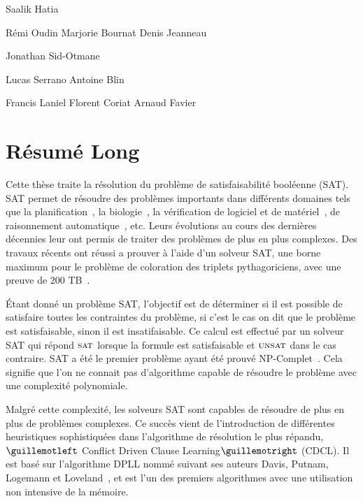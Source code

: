Saalik Hatia

Rémi Oudin
Marjorie Bournat
Denis Jeanneau

Jonathan Sid-Otmane

Lucas Serrano
Antoine Blin

Francis Laniel
Florent Coriat
Arnaud Favier











%
%

\chapter*{Résumé Long}


Cette thèse traite la résolution du problème de satisfaisabilité booléenne (SAT).
SAT permet de résoudre des problèmes importants dans différents domaines tels 
que la planification~\cite{planning_92}, la biologie~\cite{biology_06}, la vérification de logiciel et de 
matériel~\cite{biere1999symbolic}, de raisonnement automatique~\cite{heule2016solving}, etc.
Leurs évolutions au cours des dernières décennies leur ont permis de traiter des problèmes de plus en plus complexes.
Des travaux récents ont réussi a prouver à l'aide d'un solveur SAT, une borne maximum
pour le problème de coloration des triplets pythagoriciens, avec une preuve de 200 TB~\cite{heule2016solving}.


Étant donné un problème SAT, l'objectif est de  déterminer si il est possible de satisfaire toutes les contraintes du
problème, si c'est le cas on dit que le problème est satisfaisable, sinon il est insatifaisable.
%
Ce calcul est effectué par un solveur SAT qui répond $\textsc{sat}$ lorsque la formule est satisfaisable et $\textsc{unsat}$ dans le cas
contraire. SAT a été le premier problème ayant été prouvé NP-Complet~\cite{cook1971complexity}. Cela signifie que
l'on ne connait pas d'algorithme capable de résoudre le problème avec une complexité polynomiale.


Malgré cette complexité, les solveurs SAT sont capables de résoudre de plus en plus de problèmes complexes.
Ce succès vient de l'introduction de différentes heuristiques sophistiquées dans 
l'algorithme de résolution le plus répandu, $\guillemotleft$ Conflict Driven Clause Learning$\guillemotright$ (CDCL).
Il est basé sur l'algorithme DPLL nommé suivant ses auteurs Davis, Putnam, Logemann et Loveland~\cite{dpll_62},
et est l'un des premiers algorithmes avec une utilisation non intensive de la mémoire.

